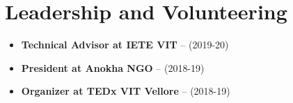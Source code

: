 \documentclass[11pt,a4paper,sans]{moderncv}        %
\begin{document}
\section{Leadership and Volunteering}

\vspace{1pt}

\begin{itemize}

\item \textbf{Technical Advisor at IETE VIT} -- (2019-20)
\item \textbf{President at Anokha NGO} -- (2018-19)
\item \textbf{Organizer at TEDx VIT Vellore} -- (2018-19)

\end{itemize}




\nocite{*}



\end{document}
